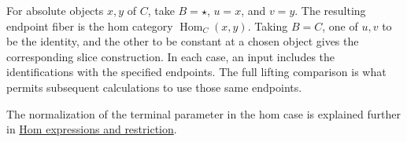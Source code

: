 \documentclass[11pt]{article}
\begin{document}
For absolute objects $x,y$ of $C$, take $B=\star$, $u=x$, and $v=y$.
The resulting endpoint fiber is the hom category $\operatorname{Hom}_C(x,y)$.
Taking $B=C$, one of $u,v$ to be the identity, and the other to be
constant at a chosen object gives the corresponding slice construction. In each case, an input includes the identifications
with the specified endpoints. The full lifting comparison is what permits
subsequent calculations to use those same endpoints.

The normalization of the terminal parameter in the hom case is explained
further in \href{supplementary-hom-expressions-and-restriction.html}{Hom expressions and restriction}.
\end{document}
